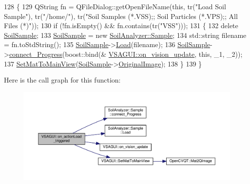 \begin{DoxyCode}
128 \{
129     QString fn = QFileDialog::getOpenFileName(\textcolor{keyword}{this}, tr(\textcolor{stringliteral}{"Load Soil Sample"}), tr(\textcolor{stringliteral}{"/home/"}), tr(\textcolor{stringliteral}{"Soil Samples
       (*.VSS);; Soil Particles (*.VPS);; All Files (*)"}));
130     \textcolor{keywordflow}{if} (!fn.isEmpty() && fn.contains(tr(\textcolor{stringliteral}{"VSS"})));
131     \{
132         \textcolor{keyword}{delete} \hyperlink{class_v_s_a_g_u_i_ac90517c9baea0a75455d43d5eb77d3e7}{SoilSample};
133         \hyperlink{class_v_s_a_g_u_i_ac90517c9baea0a75455d43d5eb77d3e7}{SoilSample} = \textcolor{keyword}{new} \hyperlink{class_soil_analyzer_1_1_sample}{SoilAnalyzer::Sample};
134         std::string filename = fn.toStdString();
135         \hyperlink{class_v_s_a_g_u_i_ac90517c9baea0a75455d43d5eb77d3e7}{SoilSample}->\hyperlink{class_soil_analyzer_1_1_sample_a88f29d8ee3fad37cdad6cb88b2c8a288}{Load}(filename);
136         \hyperlink{class_v_s_a_g_u_i_ac90517c9baea0a75455d43d5eb77d3e7}{SoilSample}->\hyperlink{class_soil_analyzer_1_1_sample_a472dfdde346375463c979e45eb75fbb7}{connect\_Progress}(boost::bind(&
      \hyperlink{class_v_s_a_g_u_i_a8a5092f741e17c73b04850a6b30dda04}{VSAGUI::on\_vision\_update}, \textcolor{keyword}{this}, \_1, \_2));
137         \hyperlink{class_v_s_a_g_u_i_a988508cf880e27fcd8a029b94e546bcc}{SetMatToMainView}(\hyperlink{class_v_s_a_g_u_i_ac90517c9baea0a75455d43d5eb77d3e7}{SoilSample}->\hyperlink{class_soil_analyzer_1_1_sample_a0d6e6fca9e232a77329daf0b4b29c634}{OriginalImage});
138     \}
139 \}
\end{DoxyCode}


Here is the call graph for this function\+:\nopagebreak
\begin{figure}[H]
\begin{center}
\leavevmode
\includegraphics[width=350pt]{class_v_s_a_g_u_i_a3a2577bbd366b5c1ffd89a8f605ab9cd_cgraph}
\end{center}
\end{figure}


